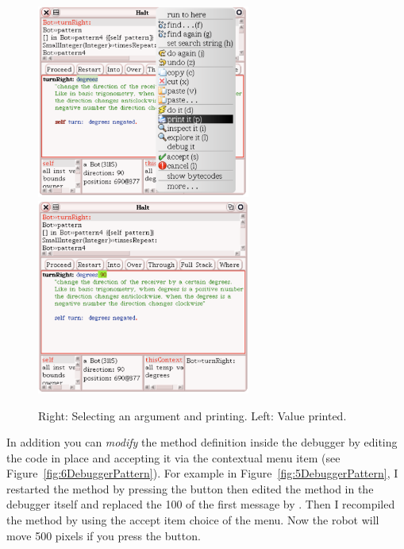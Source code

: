 \begin{figure}[h]
\centerline{\includegraphics[width=7cm]{ArgumentSelected} \includegraphics[width=7cm]{ArgumentPrinted}}
\caption{Right: Selecting an argument and printing. Left: Value printed. \label{fig:Argument}}
\end{figure}

In addition you can \emph{modify} the method definition inside the debugger by editing the code in place and accepting it via the contextual menu item  (see Figure~\ref{fig:6DebuggerPattern}). For example in Figure~\ref{fig:5DebuggerPattern}, I restarted the method by pressing the  button then edited the method in the debugger itself and replaced the 100 of the first  message by . Then I recompiled the method by using the accept item choice of the menu. Now the robot will move 500 pixels if you press the  button.

